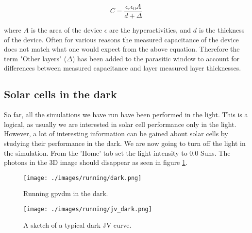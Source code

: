 \begin{equation}
C=\frac{\epsilon_r \epsilon_0 A}{d+\Delta}
\end{equation}

where $A$ is the area of the device $\epsilon$ are the hyperactivities, and $d$ is the thickness of the device.  Often for various reasons the measured capacitance of the device does not match what one would expect from the above equation. Therefore the term "Other layers" ($\Delta$) has been added to the parasitic window to account for differences between measured capacitance and layer measured layer thicknesses.

\vspace*{\fill}

\pagebreak
\subsection{Solar cells in the dark}
So far, all the simulations we have run have been performed in the light.  This is a logical, as usually we are interested in solar cell performance only in the light.  However, a lot of interesting information can be gained about solar cells by studying their performance in the dark.  We are now going to turn off the light in the simulation.  From the 'Home' tab set the light intensity to 0.0 Suns.  The photons in the 3D image should disappear as seen in figure \ref{fig:dark}.

\begin{figure}[h!]
\centering
\texttt{[image: ./images/running/dark.png]}
\caption{Running gpvdm in the dark.}
\label{fig:dark}
\end{figure}

\begin{figure}[h!]
\centering
\texttt{[image: ./images/running/jv\_dark.png]}
\caption{A sketch of a typical dark JV curve.}
\label{fig:jv_dark}
\end{figure}

